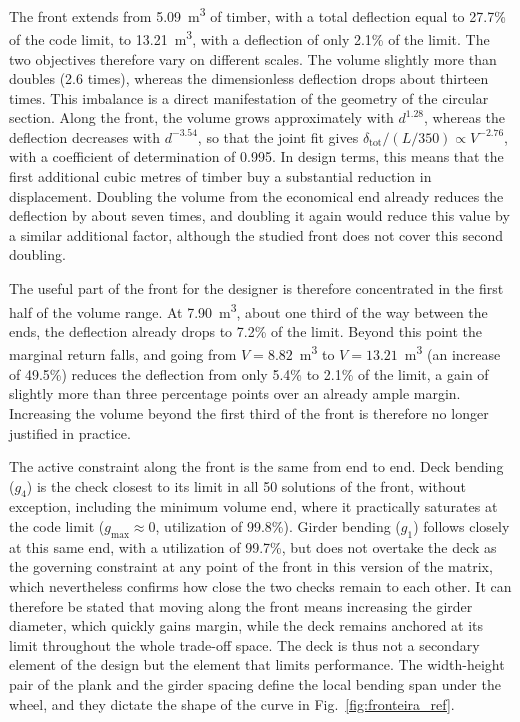 The front extends from 5.09~m\textsuperscript{3} of timber, with a total deflection equal to 27.7\% of the code limit, to 13.21~m\textsuperscript{3}, with a deflection of only 2.1\% of the limit.
The two objectives therefore vary on different scales. The volume slightly more than doubles (2.6 times), whereas the dimensionless deflection drops about thirteen times.
This imbalance is a direct manifestation of the geometry of the circular section.
Along the front, the volume grows approximately with $d^{1.28}$, whereas the deflection decreases with $d^{-3.54}$, so that the joint fit gives $\delta_{\mathrm{tot}}/(L/350) \propto V^{-2.76}$, with a coefficient of determination of 0.995.
In design terms, this means that the first additional cubic metres of timber buy a substantial reduction in displacement. Doubling the volume from the economical end already reduces the deflection by about seven times, and doubling it again would reduce this value by a similar additional factor, although the studied front does not cover this second doubling.

The useful part of the front for the designer is therefore concentrated in the first half of the volume range. At 7.90~m\textsuperscript{3}, about one third of the way between the ends, the deflection already drops to 7.2\% of the limit. Beyond this point the marginal return falls, and going from $V = 8.82$~m\textsuperscript{3} to $V = 13.21$~m\textsuperscript{3} (an increase of 49.5\%) reduces the deflection from only 5.4\% to 2.1\% of the limit, a gain of slightly more than three percentage points over an already ample margin. Increasing the volume beyond the first third of the front is therefore no longer justified in practice.


The active constraint along the front is the same from end to end.
Deck bending ($g_4$) is the check closest to its limit in all 50 solutions of the front, without exception, including the minimum volume end, where it practically saturates at the code limit ($g_{\max} \approx 0$, utilization of 99.8\%).
Girder bending ($g_1$) follows closely at this same end, with a utilization of 99.7\%, but does not overtake the deck as the governing constraint at any point of the front in this version of the matrix, which nevertheless confirms how close the two checks remain to each other.
It can therefore be stated that moving along the front means increasing the girder diameter, which quickly gains margin, while the deck remains anchored at its limit throughout the whole trade-off space.
The deck is thus not a secondary element of the design but the element that limits performance. The width-height pair of the plank and the girder spacing define the local bending span under the wheel, and they dictate the shape of the curve in Fig.~\ref{fig:fronteira_ref}.

